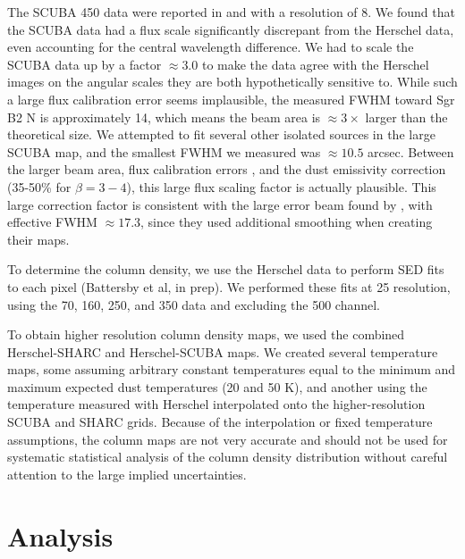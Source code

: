 \documentclass[twocolumn]{aastex61}
\newcommand{\percent}{\%\xspace}
\begin{document}
The SCUBA 450 \um data were reported in \citet{Pierce-Price2000a} and
\citet{di-Francesco2008a} with a resolution of 8\arcsec.  We found that the
SCUBA data had a flux scale significantly discrepant from the Herschel data,
even accounting for the central wavelength difference.  We had to scale the
SCUBA data up by a factor $\approx3.0$ to make the data agree with the Herschel
images on the angular scales they are both hypothetically sensitive to.
While such a large flux calibration error seems implausible, the measured
FWHM toward Sgr B2 N is approximately 14\arcsec, which means the beam area is $\approx3\times$
larger than the theoretical size.  We attempted to fit several other isolated
sources in the large SCUBA map, and the smallest FWHM we measured was $\approx10.5$
arcsec.  Between the larger beam area, flux calibration errors \citep[quoted at
20\percent in][]{Pierce-Price2000a}, and the dust emissivity correction
(35-50\percent for $\beta=3-4$), this large flux scaling factor is actually
plausible. This large correction factor is consistent with the large error beam
found by \citet{di-Francesco2008a}, with effective FWHM $\approx17.3$\arcsec,
since they used additional smoothing when creating their maps.


To determine the column density, we use the Herschel data to perform SED fits
to each pixel (Battersby et al, in prep).  We performed these fits at 25\arcsec
resolution, using the 70, 160, 250, and 350 \um data and excluding the 500 \um
channel.

To obtain higher resolution column density maps, we used the combined
Herschel-SHARC and Herschel-SCUBA maps.  We created several temperature maps,
some assuming arbitrary constant temperatures equal to the minimum and maximum
expected dust temperatures (20 and 50 K), and another using the
temperature measured with Herschel interpolated onto the higher-resolution
SCUBA and SHARC grids.  Because of the interpolation or fixed temperature
assumptions, the column maps are not very accurate and should not be used for
systematic statistical analysis of the column density distribution without
careful attention to the large implied uncertainties.  


\section{Analysis}
\end{document}

